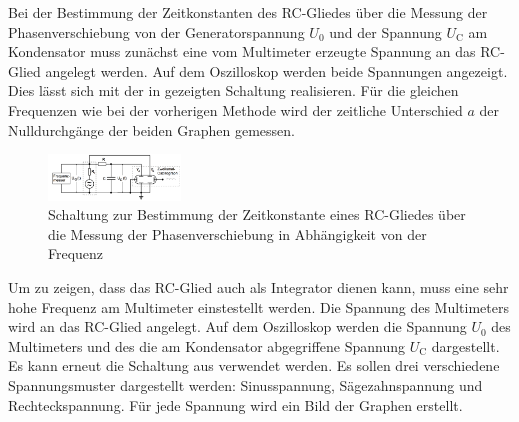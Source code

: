 Bei der Bestimmung der Zeitkonstanten des RC-Gliedes über die Messung der Phasenverschiebung
von der Generatorspannung $U_{\text{0}}$ und der Spannung $U_{\text{C}}$ am Kondensator
muss zunächst eine vom Multimeter erzeugte Spannung an das RC-Glied angelegt werden.
Auf dem Oszilloskop werden beide Spannungen angezeigt. Dies lässt sich mit der in 
gezeigten Schaltung realisieren. Für die gleichen Frequenzen wie bei der vorherigen
Methode wird der zeitliche Unterschied $a$ der Nulldurchgänge der beiden Graphen gemessen.

\begin{figure}
  \centering
  \includegraphics[width=100pt]{data/4c_schaltung.png}
  \caption{Schaltung zur Bestimmung der Zeitkonstante eines RC-Gliedes über die Messung
  der Phasenverschiebung in Abhängigkeit von der Frequenz \cite{Versuchsanleitung}}
  \label{fig:Schaltung_4c}
\end{figure}

Um zu zeigen, dass das RC-Glied auch als Integrator dienen kann, muss eine sehr hohe
Frequenz am Multimeter einstestellt werden. Die Spannung des Multimeters wird an das
RC-Glied angelegt. Auf dem Oszilloskop werden die Spannung $U_{\text{0}}$ des Multimeters und des
die am Kondensator abgegriffene Spannung $U_{\text{C}}$ dargestellt. Es kann erneut die Schaltung
aus  verwendet werden. Es sollen drei verschiedene
Spannungsmuster dargestellt werden: Sinusspannung, Sägezahnspannung und Rechteckspannung.
Für jede Spannung wird ein Bild der Graphen erstellt.
